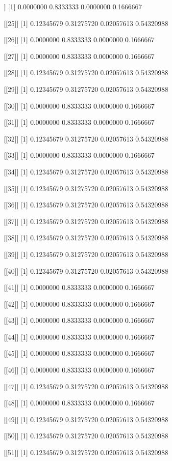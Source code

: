 \documentclass{article}
\begin{document}
\begin{Schunk}
\begin{Soutput}
[[24]]
[1] 0.0000000 0.8333333 0.0000000 0.1666667

[[25]]
[1] 0.12345679 0.31275720 0.02057613 0.54320988

[[26]]
[1] 0.0000000 0.8333333 0.0000000 0.1666667

[[27]]
[1] 0.0000000 0.8333333 0.0000000 0.1666667

[[28]]
[1] 0.12345679 0.31275720 0.02057613 0.54320988

[[29]]
[1] 0.12345679 0.31275720 0.02057613 0.54320988

[[30]]
[1] 0.0000000 0.8333333 0.0000000 0.1666667

[[31]]
[1] 0.0000000 0.8333333 0.0000000 0.1666667

[[32]]
[1] 0.12345679 0.31275720 0.02057613 0.54320988

[[33]]
[1] 0.0000000 0.8333333 0.0000000 0.1666667

[[34]]
[1] 0.12345679 0.31275720 0.02057613 0.54320988

[[35]]
[1] 0.12345679 0.31275720 0.02057613 0.54320988

[[36]]
[1] 0.12345679 0.31275720 0.02057613 0.54320988

[[37]]
[1] 0.12345679 0.31275720 0.02057613 0.54320988

[[38]]
[1] 0.12345679 0.31275720 0.02057613 0.54320988

[[39]]
[1] 0.12345679 0.31275720 0.02057613 0.54320988

[[40]]
[1] 0.12345679 0.31275720 0.02057613 0.54320988

[[41]]
[1] 0.0000000 0.8333333 0.0000000 0.1666667

[[42]]
[1] 0.0000000 0.8333333 0.0000000 0.1666667

[[43]]
[1] 0.0000000 0.8333333 0.0000000 0.1666667

[[44]]
[1] 0.0000000 0.8333333 0.0000000 0.1666667

[[45]]
[1] 0.0000000 0.8333333 0.0000000 0.1666667

[[46]]
[1] 0.0000000 0.8333333 0.0000000 0.1666667

[[47]]
[1] 0.12345679 0.31275720 0.02057613 0.54320988

[[48]]
[1] 0.0000000 0.8333333 0.0000000 0.1666667

[[49]]
[1] 0.12345679 0.31275720 0.02057613 0.54320988

[[50]]
[1] 0.12345679 0.31275720 0.02057613 0.54320988

[[51]]
[1] 0.12345679 0.31275720 0.02057613 0.54320988


\end{Soutput}
\end{Schunk}
\end{document}
